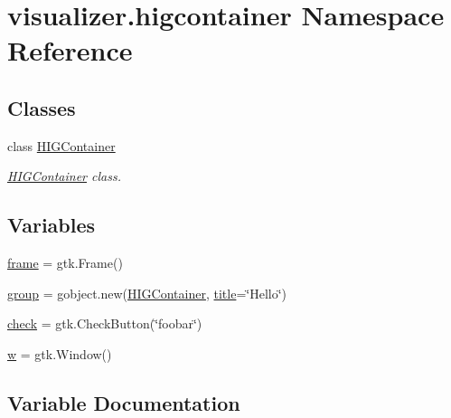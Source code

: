 \hypertarget{namespacevisualizer_1_1higcontainer}{}\section{visualizer.\+higcontainer Namespace Reference}
\label{namespacevisualizer_1_1higcontainer}
\subsection*{Classes}
\begin{DoxyCompactItemize}
\item 
class \hyperlink{classvisualizer_1_1higcontainer_1_1HIGContainer}{H\+I\+G\+Container}
\begin{DoxyCompactList}\small\item\em \hyperlink{classvisualizer_1_1higcontainer_1_1HIGContainer}{H\+I\+G\+Container} class. \end{DoxyCompactList}\end{DoxyCompactItemize}
\subsection*{Variables}
\begin{DoxyCompactItemize}
\item 
\hyperlink{namespacevisualizer_1_1higcontainer_a3a06b62552347e51aaf4765391802719}{frame} = gtk.\+Frame()
\item 
\hyperlink{namespacevisualizer_1_1higcontainer_aa6ad2b76790275bfce7783429beaa23f}{group} = gobject.\+new(\hyperlink{classvisualizer_1_1higcontainer_1_1HIGContainer}{H\+I\+G\+Container}, \hyperlink{lte__link__budget__x2__handover__measures_8m_a3f4b991df405379f6917e1683ed5a8c8}{title}=\char`\"{}Hello\char`\"{})
\item 
\hyperlink{namespacevisualizer_1_1higcontainer_ac48d36b2f857bd4ef93244235f447292}{check} = gtk.\+Check\+Button(\char`\"{}foobar\char`\"{})
\item 
\hyperlink{namespacevisualizer_1_1higcontainer_a10ef12e30d471bb1281c3444b2aba394}{w} = gtk.\+Window()
\end{DoxyCompactItemize}


\subsection{Variable Documentation}
